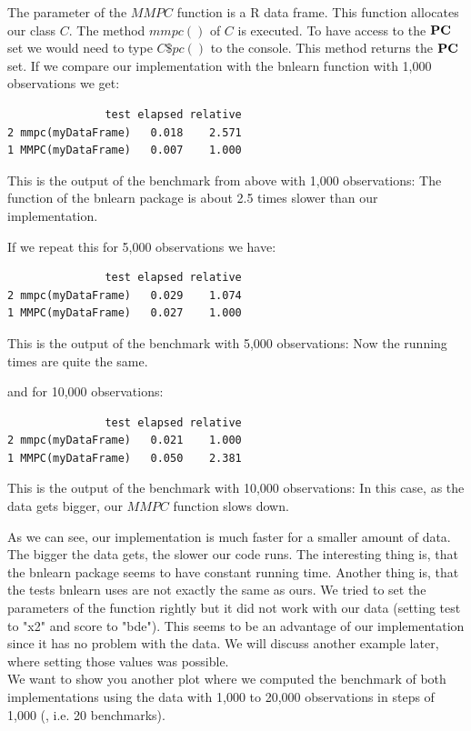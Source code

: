  	The parameter of the $MMPC$ function is a R data frame. This function allocates our class $C$. The method $mmpc()$ of $C$ is executed. To have access to the ${\textbf{PC}}$ set we would need to type $C\$pc()$ to the console. This method returns the ${\textbf{PC}}$ set. If we compare our implementation with the bnlearn function with 1,000 observations we get:
	\begin{program}[H]
		\begin{snugshade}
  			\begin{verbatim}
               test elapsed relative
2 mmpc(myDataFrame)   0.018    2.571
1 MMPC(myDataFrame)   0.007    1.000
			\end{verbatim}
 		\end{snugshade}
		\caption{This is the output of the benchmark from above with 1,000 observations: The function of the bnlearn package is about 2.5 times slower than our implementation.}
 	\end{program}

	If we repeat this for 5,000 observations we have:

	\begin{program}
		\begin{snugshade}
  			\begin{verbatim}
               test elapsed relative
2 mmpc(myDataFrame)   0.029    1.074
1 MMPC(myDataFrame)   0.027    1.000
			\end{verbatim}
 		\end{snugshade}
		\caption{This is the output of the benchmark with 5,000 observations: Now the running times are quite the same.}
 	\end{program}

	and for 10,000 observations:

	\begin{program}
		\begin{snugshade}
  			\begin{verbatim}
               test elapsed relative
2 mmpc(myDataFrame)   0.021    1.000
1 MMPC(myDataFrame)   0.050    2.381
			\end{verbatim}
 		\end{snugshade}
		\caption{This is the output of the benchmark with 10,000 observations: In this case, as the data gets bigger, our $MMPC$ function slows down.}
 	\end{program}

	As we can see, our implementation is much faster for a smaller amount of data. The bigger the data gets, the slower our code runs. The interesting thing is, that the bnlearn package seems to have constant running time. Another thing is, that the tests bnlearn uses are not exactly the same as ours. We tried to set the parameters of the function rightly but it did not work with our data (setting test to "x2" and score to "bde"). This seems to be an advantage of our implementation since it has no problem with the data. We will discuss another example later, where setting those values was possible.\\
	We want to show you another plot where we computed the benchmark of both implementations using the data with 1,000 to 20,000 observations in steps of 1,000 (, i.e. 20 benchmarks).

